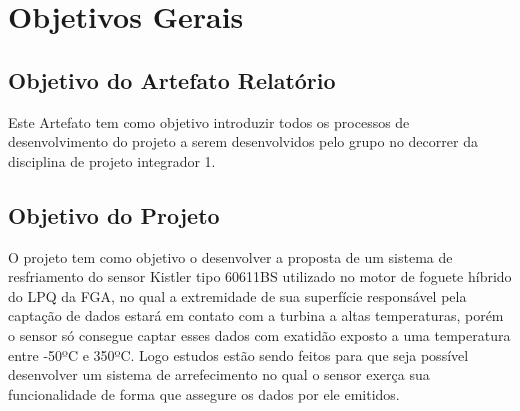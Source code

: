 \chapter{Objetivos Gerais}

\section{Objetivo do Artefato Relatório}

Este Artefato tem como objetivo introduzir todos os processos de desenvolvimento do projeto a serem desenvolvidos pelo grupo no decorrer da disciplina  de projeto integrador 1.

\section{Objetivo do Projeto}

O projeto tem como objetivo o desenvolver a proposta de um sistema de resfriamento do sensor Kistler tipo 60611BS utilizado no motor de foguete híbrido  do LPQ da FGA, no qual a extremidade de sua superfície responsável pela captação de dados estará em contato com a turbina a altas temperaturas, porém o sensor só consegue captar esses dados com exatidão exposto a uma temperatura entre -50ºC e 350ºC. Logo estudos estão sendo feitos para que seja possível desenvolver um sistema de arrefecimento no qual o sensor exerça sua funcionalidade de forma que assegure os dados por ele emitidos.
